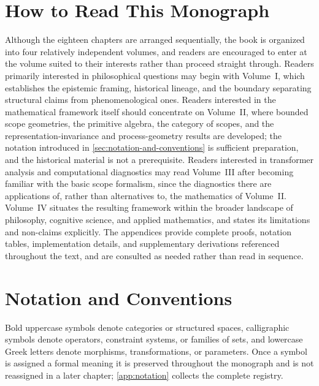 \documentclass[11pt,twoside,openright]{book}
\numberwithin{equation}{chapter}
\theoremstyle{definition}
\theoremstyle{plain}
\theoremstyle{remark}
\theoremstyle{definition}
\begin{document}
\chapter*{How to Read This Monograph}

Although the eighteen chapters are arranged sequentially, the book is
organized into four relatively independent volumes, and readers are
encouraged to enter at the volume suited to their interests rather than
proceed straight through. Readers primarily interested in philosophical
questions may begin with Volume~I, which establishes the epistemic
framing, historical lineage, and the boundary separating structural
claims from phenomenological ones. Readers interested in the mathematical
framework itself should concentrate on Volume~II, where bounded scope
geometries, the primitive algebra, the category of scopes, and the
representation-invariance and process-geometry results are developed; the
notation introduced in \cref{sec:notation-and-conventions} is sufficient
preparation, and the historical material is not a prerequisite. Readers
interested in transformer analysis and computational diagnostics may read
Volume~III after becoming familiar with the basic scope formalism,
since the diagnostics there are applications of, rather than
alternatives to, the mathematics of Volume~II. Volume~IV situates the
resulting framework within the broader landscape of philosophy, cognitive
science, and applied mathematics, and states its limitations and
non-claims explicitly. The appendices provide complete proofs, notation
tables, implementation details, and supplementary derivations referenced
throughout the text, and are consulted as needed rather than read in
sequence.

\chapter*{Notation and Conventions}
\label{sec:notation-and-conventions}

Bold uppercase symbols denote categories or structured spaces, calligraphic
symbols denote operators, constraint systems, or families of sets, and
lowercase Greek letters denote morphisms, transformations, or parameters.
Once a symbol is assigned a formal meaning it is preserved throughout the
monograph and is not reassigned in a later chapter; \cref{app:notation}
collects the complete registry.
\end{document}
